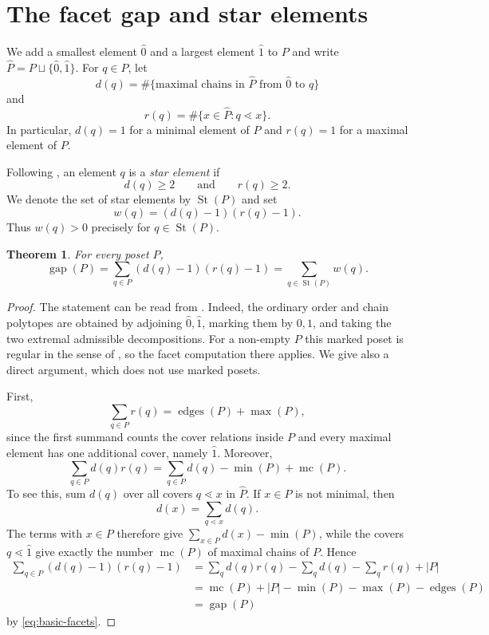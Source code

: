 \documentclass[a4paper, 11pt]{amsart}
\newtheorem{theorem}{Theorem}[section]
\theoremstyle{definition}
\theoremstyle{remark}
\newcommand{\gap}{\operatorname{gap}}
\newcommand{\St}{\operatorname{St}}
\newcommand{\ed}{\operatorname{edges}}
\newcommand{\mi}{\operatorname{min}}
\newcommand{\ma}{\operatorname{max}}
\newcommand{\mc}{\operatorname{mc}}
\begin{document}
\section{The facet gap and star elements}\label{sec:gap}

We add a smallest element $\widehat 0$ and a largest element $\widehat 1$ to $P$ and write $\widehat P=P\sqcup\{\widehat 0,\widehat 1\}$. For $q\in P$, let
\[
  d(q)=\#\{\text{maximal chains in $\widehat P$ from $\widehat 0$ to $q$}\}
\]
and
\[
  r(q)=\#\{x\in\widehat P:q\lessdot x\}.
\]
In particular, $d(q)=1$ for a minimal element of $P$ and $r(q)=1$ for a maximal element of $P$.

Following \cite{FangFourier2016}, an element $q$ is a \emph{star element} if
\[
  d(q)\ge 2\qquad\text{and}\qquad r(q)\ge 2.
\]
We denote the set of star elements by $\St(P)$ and set
\[
  w(q)=(d(q)-1)(r(q)-1).
\]
Thus $w(q)>0$ precisely for $q\in\St(P)$.

\begin{theorem}\label{thm:gap-formula}
For every poset $P$,
\begin{equation}\label{eq:gap-formula}
  \gap(P)=\sum_{q\in P}(d(q)-1)(r(q)-1)
  =\sum_{q\in\St(P)}w(q).
\end{equation}
\end{theorem}

\begin{proof}
The statement can be read from \cite[Proposition~4.5 and Corollary~4.6]{FangFourier2016}. Indeed, the ordinary order and chain polytopes are obtained by adjoining $\widehat 0,\widehat 1$, marking them by $0,1$, and taking the two extremal admissible decompositions. For a non-empty $P$ this marked poset is regular in the sense of \cite[Definition~4.1]{FangFourier2016}, so the facet computation there applies. We give also a direct argument, which does not use marked posets.

First,
\[
  \sum_{q\in P}r(q)=\ed(P)+\ma(P),
\]
since the first summand counts the cover relations inside $P$ and every maximal element has one additional cover, namely $\widehat 1$. Moreover,
\begin{equation}\label{eq:dr-doublecount}
  \sum_{q\in P}d(q)r(q)
  =\sum_{q\in P}d(q)-\mi(P)+\mc(P).
\end{equation}
To see this, sum $d(q)$ over all covers $q\lessdot x$ in $\widehat P$. If $x\in P$ is not minimal, then
\[
  d(x)=\sum_{q\lessdot x}d(q).
\]
The terms with $x\in P$ therefore give $\sum_{x\in P}d(x)-\mi(P)$, while the covers $q\lessdot\widehat 1$ give exactly the number $\mc(P)$ of maximal chains of $P$. Hence
\begin{align*}
 \sum_{q\in P}(d(q)-1)(r(q)-1)
 &=\sum_qd(q)r(q)-\sum_qd(q)-\sum_qr(q)+|P|\\
 &=\mc(P)+|P|-\mi(P)-\ma(P)-\ed(P)\\
 &=\gap(P)
\end{align*}
by \eqref{eq:basic-facets}.
\end{proof}
\end{document}
